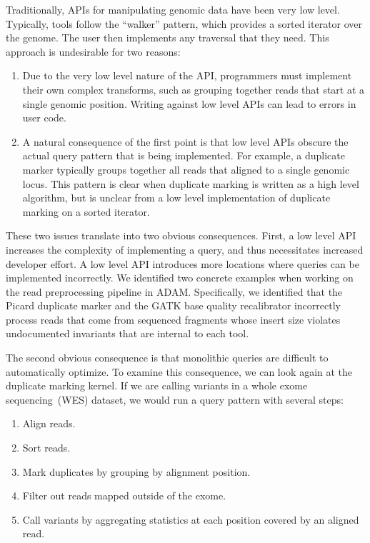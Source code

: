 \documentclass[phd]{ucbthesis}
\begin{document}
Traditionally, APIs for manipulating genomic data have been very low level.
Typically, tools follow the ``walker'' pattern, which provides a sorted
iterator over the genome. The user then implements any traversal that they need.
This approach is undesirable for two reasons:

\begin{enumerate}
\item Due to the very low level nature of the API, programmers must implement
  their own complex transforms, such as grouping together reads that start at a
  single genomic position. Writing against low level APIs can lead to errors in user code.
\item A natural consequence of the first point is that low level APIs obscure
  the actual query pattern that is being implemented. For example, a duplicate
  marker typically groups together all reads that aligned to a single genomic
  locus. This pattern is clear when duplicate marking is written as a high
  level algorithm, but is unclear from a low level implementation of duplicate
  marking on a sorted iterator.
\end{enumerate}

These two issues translate into two obvious consequences. First, a low level API
increases the complexity of implementing a query, and thus necessitates increased
developer effort. A low level API introduces more locations where queries can be
implemented incorrectly. We identified two concrete examples when
working on the read preprocessing pipeline in {ADAM}. Specifically, we
identified that the {Picard} duplicate marker and the {GATK}
base quality recalibrator incorrectly process reads that come from sequenced
fragments whose insert size violates undocumented invariants that are internal
to each tool.

The second obvious consequence is that monolithic queries are difficult to
automatically optimize. To examine this consequence, we can look again at the
duplicate marking kernel. If we are calling variants in a whole exome
sequencing~(WES) dataset, we would run a query pattern with several steps:

\begin{enumerate}
\item Align reads.
\item Sort reads.
\item Mark duplicates by grouping by alignment position.
\item Filter out reads mapped outside of the exome.
\item Call variants by aggregating statistics at each position covered by an
  aligned read.
\end{enumerate}
\end{document}
